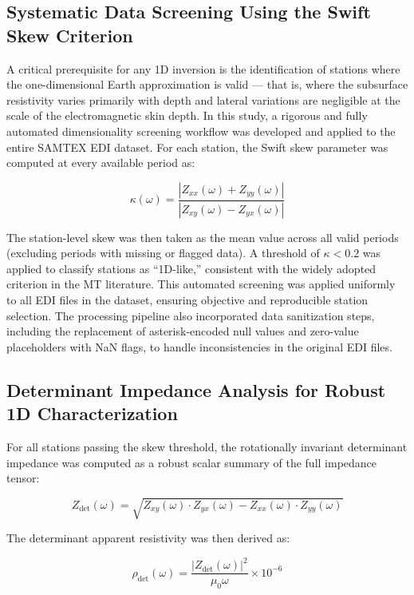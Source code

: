 \subsection*{Systematic Data Screening Using the Swift Skew Criterion}

A critical prerequisite for any 1D inversion is the identification of stations where the one-dimensional Earth approximation is valid --- that is, where the subsurface resistivity varies primarily with depth and lateral variations are negligible at the scale of the electromagnetic skin depth. In this study, a rigorous and fully automated dimensionality screening workflow was developed and applied to the entire SAMTEX EDI dataset. For each station, the Swift skew parameter was computed at every available period as:

\begin{equation}
\kappa(\omega) = \frac{|Z_{xx}(\omega) + Z_{yy}(\omega)|}{|Z_{xy}(\omega) - Z_{yx}(\omega)|}
\end{equation}

The station-level skew was then taken as the mean value across all valid periods (excluding periods with missing or flagged data). A threshold of $\kappa < 0.2$ was applied to classify stations as ``1D-like,'' consistent with the widely adopted criterion in the MT literature. This automated screening was applied uniformly to all EDI files in the dataset, ensuring objective and reproducible station selection. The processing pipeline also incorporated data sanitization steps, including the replacement of asterisk-encoded null values and zero-value placeholders with NaN flags, to handle inconsistencies in the original EDI files.

\subsection*{Determinant Impedance Analysis for Robust 1D Characterization}

For all stations passing the skew threshold, the rotationally invariant determinant impedance was computed as a robust scalar summary of the full impedance tensor:

\begin{equation}
Z_{\text{det}}(\omega) = \sqrt{Z_{xy}(\omega) \cdot Z_{yx}(\omega) - Z_{xx}(\omega) \cdot Z_{yy}(\omega)}
\end{equation}

The determinant apparent resistivity was then derived as:

\begin{equation}
\rho_{\text{det}}(\omega) = \frac{|Z_{\text{det}}(\omega)|^2}{\mu_0 \omega} \times 10^{-6}
\end{equation}

